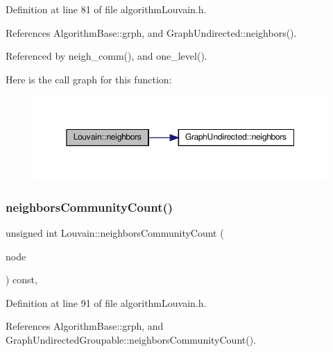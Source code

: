 Definition at line 81 of file algorithm\+Louvain.\+h.



References Algorithm\+Base\+::grph, and Graph\+Undirected\+::neighbors().



Referenced by neigh\+\_\+comm(), and one\+\_\+level().

Here is the call graph for this function\+:
\nopagebreak
\begin{figure}[H]
\begin{center}
\leavevmode
\includegraphics[width=350pt]{classLouvain_a68749bff6ff4894606b660cc827f9d79_cgraph}
\end{center}
\end{figure}
\mbox{\label{classLouvain_a10483312016ad92ce019a80afdc8d6cf}} 
\subsubsection{\texorpdfstring{neighbors\+Community\+Count()}{neighborsCommunityCount()}}
{\footnotesize\ttfamily unsigned int Louvain\+::neighbors\+Community\+Count (\begin{DoxyParamCaption}\item[{const \hyperlink{edge_8h_a5fbd20c46956d479cb10afc9855223f6}{type\+Vertex} \&}]{node }\end{DoxyParamCaption}) const\hspace{0.3cm}{\ttfamily [inline]}, {\ttfamily [private]}}



Definition at line 91 of file algorithm\+Louvain.\+h.



References Algorithm\+Base\+::grph, and Graph\+Undirected\+Groupable\+::neighbors\+Community\+Count().


